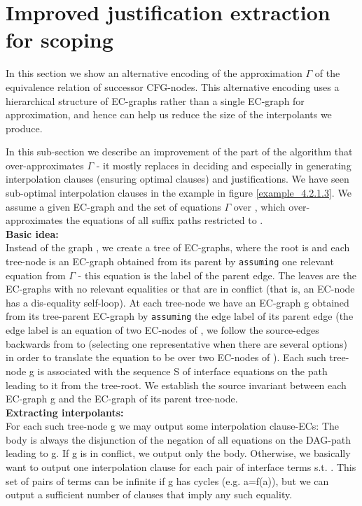 \section{Improved justification extraction for scoping}\label{appendix:gamma_approximation}
In this section we show an alternative encoding of the approximation $\Gamma$ of the equivalence relation of successor CFG-nodes.
This alternative encoding uses a hierarchical structure of EC-graphs rather than a single EC-graph for approximation, and hence can help us reduce the size of the interpolants we produce.

In this sub-section we describe an improvement of the part of the algorithm that over-approximates $\Gamma$ - 
it mostly replaces  in deciding \eqg{} and especially in generating interpolation clauses (ensuring optimal clauses) and justifications.
We have seen sub-optimal interpolation clauses in the example in figure \ref{example_4.2.1.3}.
We assume a given EC-graph  and the set of equations $\Gamma$ over , which over-approximates the equations of all suffix paths restricted to .\\
\textbf{Basic idea:}\\
Instead of the graph , we create a tree of EC-graphs, where the root is  and each tree-node is an EC-graph obtained from its parent by \lstinline|assuming| one relevant equation from $\Gamma$ - this equation is the label of the parent edge.
The leaves are the EC-graphs with no relevant equalities or that are in conflict (that is, an EC-node has a dis-equality self-loop).
At each tree-node we have an EC-graph g obtained from its tree-parent EC-graph by \lstinline|assuming| the edge label of its parent edge (the edge label is an equation of two EC-nodes of , we follow the source-edges backwards from  to  (selecting one representative when there are several options) in order to translate the equation to be over two EC-nodes of ).
Each such tree-node g is associated with the sequence S of interface equations on the path leading to it from the tree-root.
We establish the source invariant between each EC-graph g and the EC-graph  of its parent tree-node.\\
\textbf{Extracting interpolants:}\\
For each such tree-node g we may output some interpolation clause-ECs:
The body is always the disjunction of the negation of all equations on the DAG-path leading to g.
If g is in conflict, we output only the body.
Otherwise, we basically want to output one interpolation clause for each pair of interface terms  s.t. . This set of pairs of terms can be infinite if g has cycles (e.g. a=f(a)), but we can output a sufficient number of clauses that imply any such equality.\\
